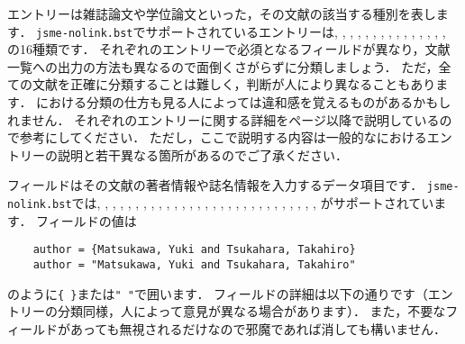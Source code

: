 \documentclass[a4paper,fleqn,uplatex,dvipdfmx]{jsarticle}
\newcommand{\jsmefile}{\texttt{jsme-nolink.bst}}
\begin{document}
エントリーは雑誌論文や学位論文といった，その文献の該当する種別を表します．
\jsmefile でサポートされているエントリーは\ttarticle, \ttbook, \ttbooklet, \ttcomment, \ttconference, \ttinbook, \ttincollection, \ttinproceedings, \ttmanual, \ttmastersthesis, \ttmisc, \ttonline, \ttphdthesis, \ttproceedings, \tttechreport, \ttunpublished の16種類です．
それぞれのエントリーで必須となるフィールドが異なり，文献一覧への出力の方法も異なるので面倒くさがらずに分類しましょう．
ただ，全ての文献を正確に分類することは難しく，判断が人により異なることもあります．
\JSMErepos における分類の仕方も見る人によっては違和感を覚えるものがあるかもしれません．
それぞれのエントリーに関する詳細を\pageref{ssec:article}ページ以降で説明しているので参考にしてください．
ただし，ここで説明する内容は一般的な\BibTeX{}におけるエントリーの説明と若干異なる箇所があるのでご了承ください．

フィールドはその文献の著者情報や誌名情報を入力するデータ項目です．
\jsmefile では\ttaccess, \ttaddress, \ttarchivePrefix, \ttauthor, \ttbooktitle, \ttchapter, \ttdoi, \ttedition, \tteditor, \tteprint, \tthowpublished, \ttinstitution, \ttjournal, \ttkey, \ttlangid, \ttlanguage, \ttmonth, \ttnote, \ttnumber, \ttorganization, \ttpages, \ttpublisher, \ttschool, \ttseries, \tttitle, \tttype, \tturl, \ttvolume, \ttyear, \ttyomi がサポートされています．
フィールドの値は
\begin{verbatim}
    author = {Matsukawa, Yuki and Tsukahara, Takahiro}
    author = "Matsukawa, Yuki and Tsukahara, Takahiro"
\end{verbatim}
のように\verb|{ }|または\verb|" "|で囲います．
フィールドの詳細は以下の通りです（エントリーの分類同様，人によって意見が異なる場合があります）．
また，不要なフィールドがあっても無視されるだけなので邪魔であれば消しても構いません．
\end{document}
